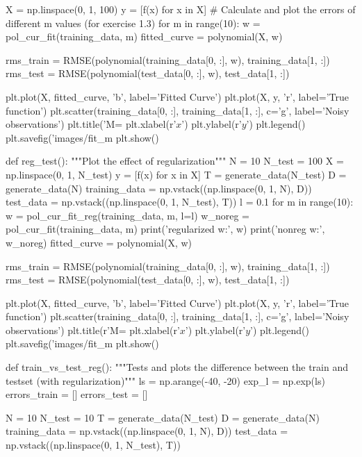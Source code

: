 \documentclass{article}
\begin{document}
\begin{python}
    X = np.linspace(0, 1, 100)
    y = [f(x) for x in X]
    # Calculate and plot the errors of different m values (for exercise 1.3)
    for m in range(10):
        w = pol_cur_fit(training_data, m)
        fitted_curve = polynomial(X, w)

        rms_train = RMSE(polynomial(training_data[0, :], w), training_data[1, :])
        rms_test = RMSE(polynomial(test_data[0, :], w), test_data[1, :])

        plt.plot(X, fitted_curve, 'b', label='Fitted Curve')
        plt.plot(X, y, 'r', label='True function')
        plt.scatter(training_data[0, :], training_data[1, :], c='g', label='Noisy observations')
        plt.title('M=%
        plt.xlabel(r'$x$')
        plt.ylabel(r'$y$')
        plt.legend()
        plt.savefig('images/fit_m%
        plt.show()

def reg_test():
    """Plot the effect of regularization"""
    N = 10
    N_test = 100
    X = np.linspace(0, 1, N_test)
    y = [f(x) for x in X]
    T = generate_data(N_test)
    D = generate_data(N)
    training_data = np.vstack((np.linspace(0, 1, N), D))
    test_data = np.vstack((np.linspace(0, 1, N_test), T))
    l = 0.1
    for m in range(10):
        w = pol_cur_fit_reg(training_data, m, l=l)
        w_noreg = pol_cur_fit(training_data, m)
        print('regularized w:', w)
        print('nonreg w:', w_noreg)
        fitted_curve = polynomial(X, w)

        rms_train = RMSE(polynomial(training_data[0, :], w), training_data[1, :])
        rms_test = RMSE(polynomial(test_data[0, :], w), test_data[1, :])

        plt.plot(X, fitted_curve, 'b', label='Fitted Curve')
        plt.plot(X, y, 'r', label='True function')
        plt.scatter(training_data[0, :], training_data[1, :], c='g', label='Noisy observations')
        plt.title(r'M=%
        plt.xlabel(r'$x$')
        plt.ylabel(r'$y$')
        plt.legend()
        plt.savefig('images/fit_m%
        plt.show()


def train_vs_test_reg():
    """Tests and plots the difference between the train and testset (with regularization)"""
    ls = np.arange(-40, -20)
    exp_l = np.exp(ls)
    errors_train = []
    errors_test = []

    N = 10
    N_test = 10
    T = generate_data(N_test)
    D = generate_data(N)
    training_data = np.vstack((np.linspace(0, 1, N), D))
    test_data = np.vstack((np.linspace(0, 1, N_test), T))


\end{python}
\end{document}
